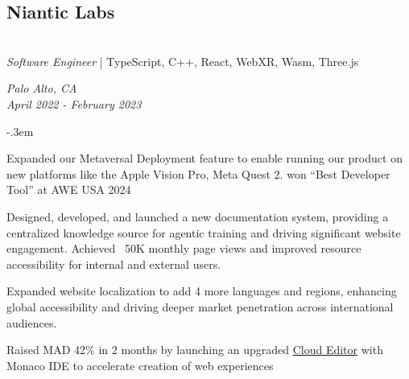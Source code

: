 \documentclass{article}
\let\olditemize=\itemize \let\endolditemize=\enditemize
\renewenvironment{itemize}{\olditemize[topsep=0em] \itemsep-.3em}{\endolditemize}
\newenvironment{twocolentry}[2][]{
    \def\secondColumn{#2}
    \raggedright
    \setcolumnwidth{\fill, 6cm}
    \begin{paracol}{2}
}{
    \switchcolumn \raggedleft \secondColumn
    \end{paracol}
} %
\begin{document}
\begin{twocolentry}{
  \textit{Palo Alto, CA} \\
  \textit{April 2022 - February 2023}
}
\subsection{Niantic Labs}\hfill\\
\textit{Software Engineer} | TypeScript, C++, React, WebXR, Wasm, Three.js
\end{twocolentry}
\begin{itemize}
  \item Expanded our Metaversal Deployment feature to enable running our product on new platforms
  like the Apple Vision Pro, Meta Quest 2. won “Best Developer Tool” at AWE USA 2024
  \item Designed, developed, and launched a new documentation system, providing a centralized
  knowledge source for agentic training and driving significant website engagement. Achieved ~50K
  monthly page views and improved resource accessibility for internal and external users.
  \item Expanded website localization to add 4 more languages and regions, enhancing global
  accessibility and driving deeper market penetration across international audiences.
  \item Raised MAD 42\% in 2 months by launching an upgraded
  \href{https://www.8thwall.com/blog/post/100048869700/introducing-the-all-new-8th-wall-cloud-editor}{Cloud
  Editor} with Monaco IDE to accelerate creation of web experiences
\end{itemize}
\end{document}

